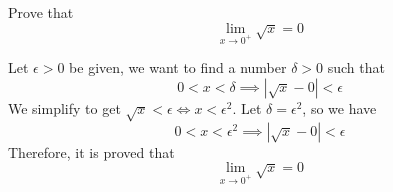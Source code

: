 \begin{problem}
    Prove that \[\lim_{x\to 0^+}\sqrt{x}=0\]
\end{problem}
\begin{solution}
    Let \(\epsilon>0\) be given, we want to find a number \(\delta>0\) such
    that \[0<x<\delta \implies |\sqrt{x}-0|<\epsilon\]
    We simplify to get \(\sqrt{x}<\epsilon\iff x<\epsilon^2\).
    Let \(\delta=\epsilon^2\), so we have
    \[0<x<\epsilon^2\implies|\sqrt{x}-0|<\epsilon\]
    Therefore, it is proved that \[\lim_{x\to 0^+}\sqrt{x}=0\]
\end{solution}